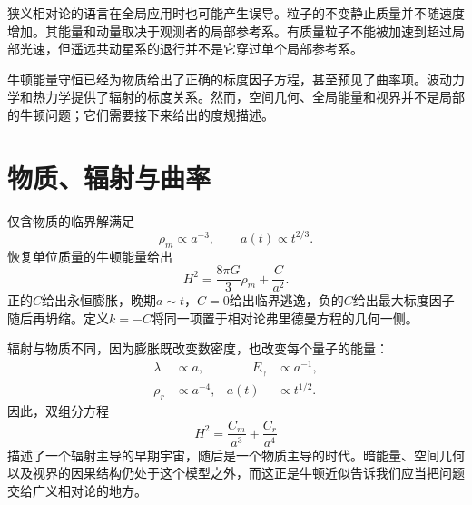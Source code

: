 狭义相对论的语言在全局应用时也可能产生误导。粒子的不变静止质量并不随速度增加。其能量和动量取决于观测者的局部参考系。有质量粒子不能被加速到超过局部光速，但遥远共动星系的退行并不是它穿过单个局部参考系。

\begin{classroomqa}
\end{classroomqa}

\begin{classroomqa}
\end{classroomqa}

牛顿能量守恒已经为物质给出了正确的标度因子方程，甚至预见了曲率项。波动力学和热力学提供了辐射的标度关系。然而，空间几何、全局能量和视界并不是局部的牛顿问题；它们需要接下来给出的度规描述。

\section{物质、辐射与曲率}

仅含物质的临界解满足
\begin{equation}
\rho_m\propto a^{-3},
\qquad
a(t)\propto t^{2/3}.
\end{equation}
恢复单位质量的牛顿能量给出
\begin{equation}
H^2=\frac{8\pi G}{3}\rho_m+\frac{C}{a^2}.
\end{equation}
正的\(C\)给出永恒膨胀，晚期\(a\sim t\)，\(C=0\)给出临界逃逸，负的\(C\)给出最大标度因子随后再坍缩。定义\(k=-C\)将同一项置于相对论弗里德曼方程的几何一侧。

辐射与物质不同，因为膨胀既改变数密度，也改变每个量子的能量：
\begin{equation}
\begin{aligned}
\lambda&\propto a,
&\qquad E_\gamma&\propto a^{-1},\\
\rho_r&\propto a^{-4},
& a(t)&\propto t^{1/2}.
\end{aligned}
\end{equation}
因此，双组分方程
\begin{equation}
H^2=\frac{C_m}{a^3}+\frac{C_r}{a^4}
\end{equation}
描述了一个辐射主导的早期宇宙，随后是一个物质主导的时代。暗能量、空间几何以及视界的因果结构仍处于这个模型之外，而这正是牛顿近似告诉我们应当把问题交给广义相对论的地方。
